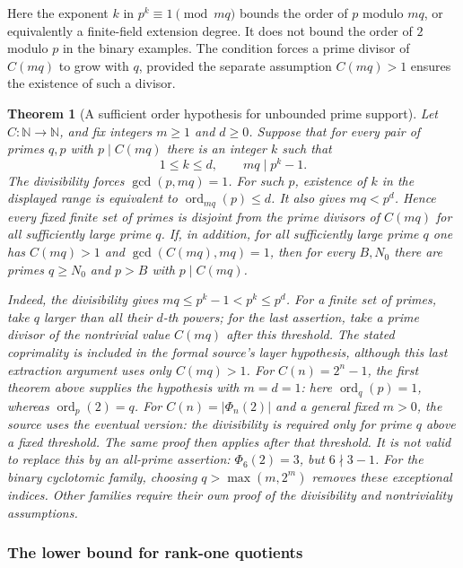 \documentclass[11pt]{article}
\theoremstyle{plain}
\newtheorem{thm}{Theorem}[section]
\theoremstyle{definition}
\theoremstyle{remark}
\newcommand{\N}{\mathbb{N}}
\begin{document}
Here the exponent $k$ in $p^k\equiv1\pmod{mq}$ bounds the order
of $p$ modulo $mq$, or equivalently a finite-field extension degree.
It does not bound the order of $2$ modulo $p$ in the binary examples.
The condition forces a prime divisor of $C(mq)$ to grow with $q$,
provided the separate assumption $C(mq)>1$ ensures the existence of
such a divisor.

\begin{thm}[A sufficient order hypothesis for unbounded prime support]\label{thm:sufficient-order-hypothesis-unbounded-prime}
Let $C:\N\to\N$, and fix integers $m\ge1$ and $d\ge0$. Suppose that
for every pair of primes $q,p$ with $p\mid C(mq)$ there is an integer
$k$ such that
\[
 1\le k\le d,\qquad mq\mid p^k-1.
\]
The divisibility forces $\gcd(p,mq)=1$. For such $p$, existence of
$k$ in the displayed range is equivalent to
$\operatorname{ord}_{mq}(p)\le d$. It also gives $mq<p^d$.
Hence every fixed finite set of primes is disjoint from
the prime divisors of $C(mq)$ for all sufficiently large prime $q$.
If, in addition, for all sufficiently large prime $q$ one has
$C(mq)>1$ and $\gcd(C(mq),mq)=1$, then for every $B,N_0$ there are
primes $q\ge N_0$ and $p>B$ with $p\mid C(mq)$.

Indeed, the divisibility gives $mq\le p^k-1<p^k\le p^d$.
For a finite set of primes, take $q$ larger than all their $d$-th powers;
for the last assertion, take a prime divisor of the nontrivial value
$C(mq)$ after this threshold. The stated coprimality is included in the
formal source's layer hypothesis, although this last extraction argument
uses only $C(mq)>1$.
For $C(n)=2^n-1$, the first theorem above supplies the hypothesis with
$m=d=1$: here $\operatorname{ord}_q(p)=1$, whereas
$\operatorname{ord}_p(2)=q$. For $C(n)=|\Phi_n(2)|$ and a general fixed $m>0$, the source
uses the \emph{eventual} version: the divisibility is required only for
prime $q$ above a fixed threshold. The same proof then applies after that
threshold. It is not valid to replace this by an all-prime assertion:
$\Phi_6(2)=3$, but $6\nmid3-1$. For the binary cyclotomic family, choosing
$q>\max(m,2^m)$ removes these exceptional indices. Other families require
their own proof of the divisibility and nontriviality assumptions.
\end{thm}

\subsubsection{The lower bound for rank-one quotients}
\label{rank-one-subrank}
\end{document}
